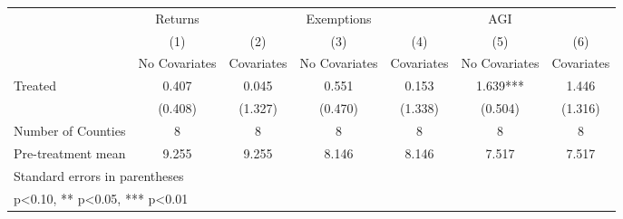 {
\def\sym#1{\ifmmode^{#1}\else\(^{#1}\)\fi}
\begin{tabular}{l*{6}{c}}
\hline\hline
            &     Returns   &               &  Exemptions   &               &         AGI   &               \\
            &\multicolumn{1}{c}{(1)}&\multicolumn{1}{c}{(2)}&\multicolumn{1}{c}{(3)}&\multicolumn{1}{c}{(4)}&\multicolumn{1}{c}{(5)}&\multicolumn{1}{c}{(6)}\\
            &\multicolumn{1}{c}{No Covariates}&\multicolumn{1}{c}{Covariates}&\multicolumn{1}{c}{No Covariates}&\multicolumn{1}{c}{Covariates}&\multicolumn{1}{c}{No Covariates}&\multicolumn{1}{c}{Covariates}\\
\hline
Treated     &       0.407   &       0.045   &       0.551   &       0.153   &       1.639***&       1.446   \\
            &     (0.408)   &     (1.327)   &     (0.470)   &     (1.338)   &     (0.504)   &     (1.316)   \\
\hline
Number of Counties&           8   &           8   &           8   &           8   &           8   &           8   \\
Pre-treatment mean&       9.255   &       9.255   &       8.146   &       8.146   &       7.517   &       7.517   \\
\hline\hline
\multicolumn{7}{l}{\footnotesize Standard errors in parentheses}\\
\multicolumn{7}{l}{\footnotesize * p<0.10, ** p<0.05, *** p<0.01}\\
\end{tabular}
}

